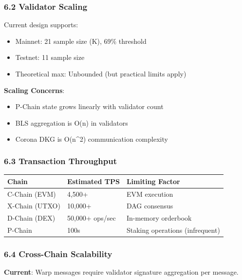 \documentclass[
]{article}
\newcounter{none} %
\providecommand{\tightlist}{%
  \setlength{\itemsep}{0pt}\setlength{\parskip}{0pt}}
\begin{document}
\subsubsection{6.2 Validator Scaling}\label{62-validator-scaling}

Current design supports:

\begin{itemize}
\tightlist
\item
  Mainnet: 21 sample size (K), 69\% threshold
\item
  Testnet: 11 sample size
\item
  Theoretical max: Unbounded (but practical limits apply)
\end{itemize}

\textbf{Scaling Concerns}:

\begin{itemize}
\tightlist
\item
  P-Chain state grows linearly with validator count
\item
  BLS aggregation is O(n) in validators
\item
  Corona DKG is O(n\^{}2) communication complexity
\end{itemize}

\subsubsection{6.3 Transaction
Throughput}\label{63-transaction-throughput}

{\def\LTcaptype{none} %
\begin{longtable}[]{@{}lll@{}}
\toprule\noalign{}
Chain & Estimated TPS & Limiting Factor \\
\midrule\noalign{}
\endhead
\bottomrule\noalign{}
\endlastfoot
C-Chain (EVM) & 4,500+ & EVM execution \\
X-Chain (UTXO) & 10,000+ & DAG consensus \\
D-Chain (DEX) & 50,000+ ops/sec & In-memory orderbook \\
P-Chain & 100s & Staking operations (infrequent) \\
\end{longtable}
}

\subsubsection{6.4 Cross-Chain
Scalability}\label{64-cross-chain-scalability}

\textbf{Current}: Warp messages require validator signature aggregation
per message.
\end{document}
